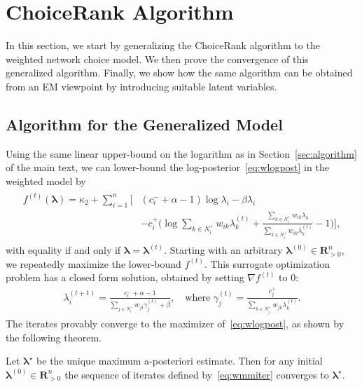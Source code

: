 \section{ChoiceRank Algorithm}  %
\label{app:algorithm}

In this section, we start by generalizing the ChoiceRank algorithm to the weighted network choice model.
We then prove the convergence of this generalized algorithm.
Finally, we show how the same algorithm can be obtained from an EM viewpoint by introducing suitable latent variables.

\subsection{Algorithm for the Generalized Model}

Using the same linear upper-bound on the logarithm as in Section~\ref{sec:algorithm} of the main text, we can lower-bound the log-posterior~\eqref{eq:wlogpost} in the weighted model by
\begin{align}
\label{eq:wminorizing}
\begin{aligned}
f^{(t)}(\bm{\lambda}) = \kappa_2 + \sum_{i = 1}^n \bigg[
    & (c^-_i + \alpha - 1) \log \lambda_i - \beta \lambda_i \\
    &- c^+_i \bigg( \log\!\sum_{k \in N^+_i}\!w_{ik} \lambda^{(t)}_k
                   +\frac{\sum_{k \in N^+_i}\!w_{ik} \lambda_k}{\sum_{k \in N^+_i}\!w_{ik} \lambda^{(t)}_k} -1 \bigg) \bigg],
\end{aligned}
\end{align}
with equality if and only if $\bm{\lambda} = \bm{\lambda}^{(t)}$.
Starting with an arbitrary $\bm{\lambda}^{(0)} \in \mathbf{R}^n_{>0}$, we repeatedly maximize the lower-bound $f^{(t)}$.
This surrogate optimization problem has a closed form solution, obtained by setting $\nabla f^{(t)}$ to $0$:
\begin{align}
\label{eq:wmmiter}
\lambda_i^{(t + 1)} = \frac{c^-_i + \alpha - 1}{\sum_{j \in N^-_i} w_{ji} \gamma_j^{(t)} + \beta},
    \quad \text{where }
    \gamma_j^{(t)} = \frac{c^+_j}{\sum_{k \in N^+_j} w_{jk} \lambda_k^{(t)}}.
\end{align}
The iterates provably converge to the maximizer of~\eqref{eq:wlogpost}, as shown by the following theorem.

\begin{theorem}
\label{thm:wmmconv}
Let $\bm{\lambda}^\star$ be the unique maximum a-posteriori estimate.
Then for any initial $\bm{\lambda}^{(0)} \in \mathbf{R}^n_{> 0}$ the sequence of iterates defined by~\eqref{eq:wmmiter} converges to $\bm{\lambda}^\star$.
\end{theorem}

